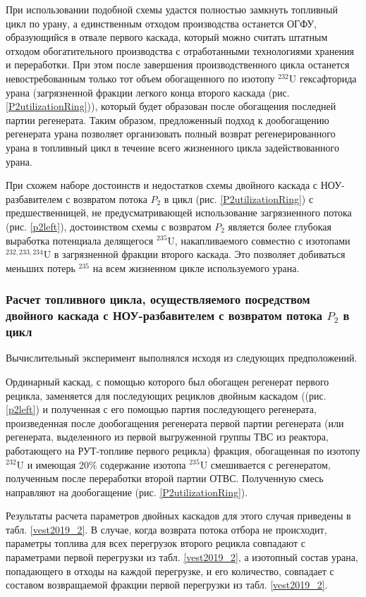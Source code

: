 При использовании подобной схемы удастся полностью замкнуть топливный цикл по урану, а единственным отходом производства останется ОГФУ, образующийся в отвале первого каскада, который можно считать штатным отходом обогатительного производства с отработанными технологиями хранения и переработки. При этом после завершения производственного цикла останется невостребованным только тот объем обогащенного по изотопу $^{232}$U гексафторида урана (загрязненной фракции легкого конца второго каскада (рис. \ref{P2utilizationRing})), который будет образован после обогащения последней партии регенерата. Таким образом, предложенный подход к дообогащению регенерата урана позволяет организовать полный возврат регенерированного урана в топливный цикл в течение всего жизненного цикла задействованного урана.

При схожем наборе достоинств и недостатков схемы двойного каскада с НОУ-разбавителем с возвратом потока $P_2$ в цикл (рис. \ref{P2utilizationRing}) с предшественницей, не предусматривающей использование загрязненного потока (рис. \ref{p2left}), достоинством схемы с возвратом $P_2$ является более глубокая выработка потенциала делящегося $^{235}$U, накапливаемого совместно с изотопами $^{232,233,234}$U в загрязненной фракции второго каскада. Это позволяет добиваться меньших потерь $^{235}$ на всем жизненном цикле используемого урана.


\subsubsection{Расчет топливного цикла, осуществляемого посредством двойного каскада с НОУ-разбавителем с возвратом потока $P_2$ в цикл}

Вычислительный эксперимент выполнялся исходя из следующих предположений.

Ординарный каскад, с помощью которого был обогащен регенерат первого рецикла, заменяется для последующих рециклов двойным каскадом ((рис. \ref{p2left}) и  полученная с его помощью партия последующего регенерата, произведенная после дообогащения регенерата первой партии регенерата (или регенерата, выделенного из первой выгруженной группы ТВС из реактора, работающего на РУТ-топливе первого рецикла) фракция, обогащенная по изотопу $^{232}$U и имеющая 20\% содержание изотопа $^{235}$U смешивается с регенератом, полученным после переработки второй партии ОТВС. Полученную смесь направляют на дообогащение (рис. \ref{P2utilizationRing}).


Результаты расчета параметров двойных каскадов для этого случая приведены в табл. \ref{vest2019_2}. В случае, когда возврата потока отбора не происходит, параметры топлива для всех перегрузок второго рецикла совпадают с параметрами первой перегрузки из табл. \ref{vest2019_2}, а изотопный состав урана, попадающего в отходы на каждой перегрузке, и его количество, совпадает с составом возвращаемой фракции первой перегрузки из табл. \ref{vest2019_2}.

